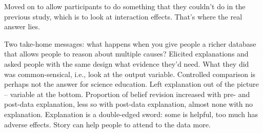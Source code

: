 Moved on to allow participants to do something that they couldn't do in the previous
study, which is to look at interaction effects.
That's where the real answer lies.

Two take-home messages: what happens when you give people a richer database that allows
people to reason about multiple causes?
Elicited explanations and asked people with the same design what evidence they'd need.
What they did was common-sensical, i.e., look at the output variable.
Controlled comparison is perhaps not the answer for science education.
Left explanation out of the picture -- variable at the bottom.
Proportion of belief revision increased with pre- and post-data explanation, less so
with post-data explanation, almost none with no explanation.
Explanation is a double-edged sword: some is helpful, too much has adverse effects.
Story can help people to attend to the data more.
